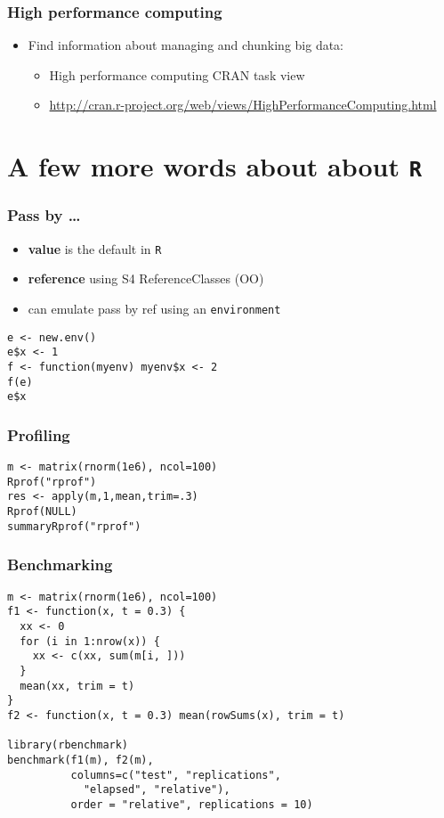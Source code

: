 \documentclass{beamer}
\newcommand{\R}{\texttt{R} }
\begin{document}
\begin{frame}
\frametitle{High performance computing}
\label{sec-5-3}


\begin{itemize}
\item Find information about managing and chunking big data:
\begin{itemize}
\item High performance computing CRAN task view
\item \href{http://cran.r-project.org/web/views/HighPerformanceComputing.html}{http://cran.r-project.org/web/views/HighPerformanceComputing.html}
\end{itemize}
\end{itemize}
\end{frame}
\section{A few more words about about \R}
\label{sec-6}
\begin{frame}[fragile]
\frametitle{Pass by \ldots{}}
\label{sec-6-1}


\begin{itemize}
\item \textbf{value} is the default in \R
\item \textbf{reference} using S4 ReferenceClasses (OO)
\item can emulate pass by ref using an \texttt{environment}
\end{itemize}


\begin{verbatim}
e <- new.env()
e$x <- 1
f <- function(myenv) myenv$x <- 2
f(e)
e$x
\end{verbatim}
\end{frame}
\begin{frame}[fragile]
\frametitle{Profiling}
\label{sec-6-2}



\begin{verbatim}
m <- matrix(rnorm(1e6), ncol=100)
Rprof("rprof")                                
res <- apply(m,1,mean,trim=.3)                
Rprof(NULL)
summaryRprof("rprof")
\end{verbatim}
\end{frame}
\begin{frame}[fragile]
\frametitle{Benchmarking}
\label{sec-6-3}



\begin{verbatim}
m <- matrix(rnorm(1e6), ncol=100)
f1 <- function(x, t = 0.3) {
  xx <- 0
  for (i in 1:nrow(x)) {
    xx <- c(xx, sum(m[i, ]))
  }
  mean(xx, trim = t)
}
f2 <- function(x, t = 0.3) mean(rowSums(x), trim = t)

library(rbenchmark)
benchmark(f1(m), f2(m),
          columns=c("test", "replications", 
            "elapsed", "relative"),
          order = "relative", replications = 10)
\end{verbatim}
\end{frame}
\end{document}

